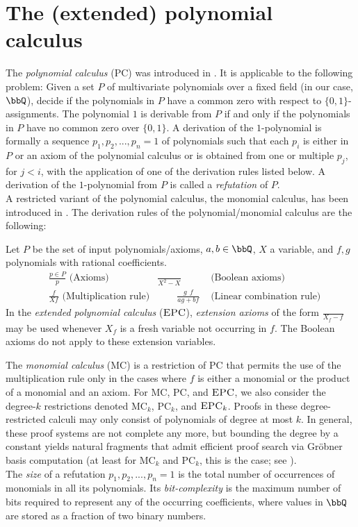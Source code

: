 \documentclass[a4paper,UKenglish,cleveref, autoref, thm-restate]{lipics-v2021}
\newcommand{\EPC}{\mbox{\sc EPC}}
\newcommand{\PC}{\textrm {PC}}
\newcommand{\MC}{\textrm{MC}}
\begin{document}
	
	\section{The (extended) polynomial calculus}
	
	\label{sec:proofSystems}
	The \emph{polynomial calculus} ($\PC$) was introduced in \cite{groebner}. It is applicable to the following problem: Given a set $P$ of multivariate polynomials over a fixed field (in our case, $\bbQ$), decide if the polynomials in $P$ have a common zero with respect to $\{0,1\}$-assignments. The polynomial $1$ is derivable from $P$ if and only if the polynomials in $P$ have no common zero over $\{0,1\}$. A derivation of the $1$-polynomial is formally a sequence $p_1,p_2,...,p_n = 1$ of polynomials such that each $p_i$ is either in $P$ or an axiom of the polynomial calculus or is obtained from one or multiple $p_j$, for $j < i$, with the application of one of the derivation rules listed below. A derivation of the $1$-polynomial from $P$ is called a \emph{refutation} of $P$.\\
	A restricted variant of the polynomial calculus, the monomial calculus, has been introduced in \cite{berkholz}.
	The derivation rules of the polynomial/monomial calculus are the following:
	\begin{definition}
		Let $P$ be the set of input polynomials/axioms, $a,b \in \bbQ$, $X$ a variable, and $f,g$ polynomials with rational coefficients.
		\begin{align*}
			&\frac{p \in P}{p} \text{ (Axioms)}  \qquad &\frac{}{X^2 - X} &\text{ (Boolean axioms)} \\ &\frac{f}{Xf} 
			\text{ (Multiplication rule)} &\qquad
			\frac{g \ \ f}{ag+bf} &\text{ (Linear 
				combination rule)} 
		\end{align*}
		In the \emph{extended polynomial calculus} ($\EPC$), \emph{extension axioms} of the form $\frac{}{X_f - f}$ may be used whenever $X_f$ is a fresh variable not occurring in $f$. The Boolean axioms do not apply to these extension variables.
	\end{definition}
	The \emph{monomial calculus} ($\MC$) is a restriction of $\PC$ that permits the
	use of the multiplication rule only in the cases where $f$ is either a 
	monomial or the product of a monomial and an axiom.	For $\MC$, $\PC$, and $\EPC$, we also consider the degree-$k$ restrictions denoted $\MC_k$, $\PC_k$, and $\EPC_k$. Proofs in these degree-restricted calculi may only consist of polynomials of degree at most $k$. In general, these proof systems are not complete any more, but bounding the degree by a constant yields natural fragments that admit efficient proof search via Gröbner basis computation (at least for $\MC_k$ and $\PC_k$, this is the case; see \cite{groebner}).\\
	The \emph{size} of a refutation $p_1,p_2,...,p_n = 1$ is the total number of occurrences of monomials in all its polynomials. Its \emph{bit-complexity} is the maximum number of bits required to represent any of the occurring coefficients, where values in $\bbQ$ are stored as a fraction of two binary numbers.\\ 
\end{document}
